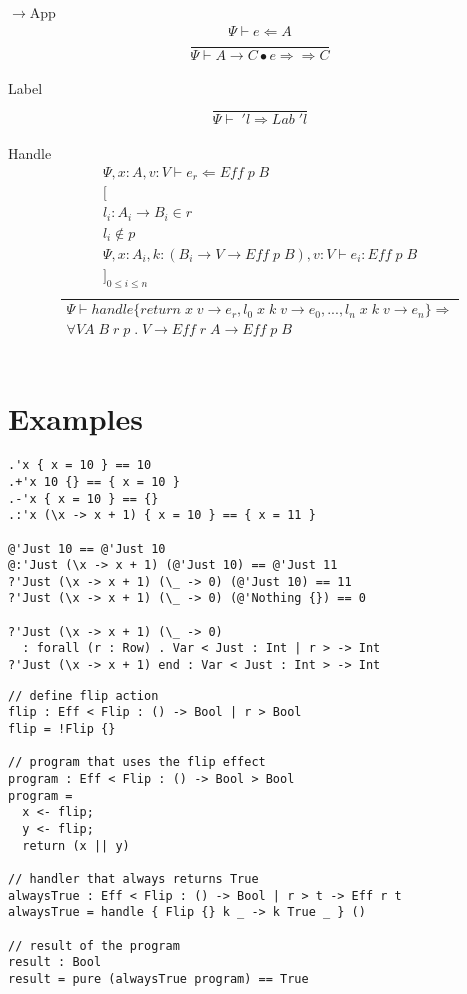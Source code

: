 \documentclass[12pt]{article}
\newcommand\synth[0]{\Rightarrow \!\!\! \Rightarrow}
\begin{document}
$\rightarrow$App \[\frac{
	\begin{array}{c}
	\Psi \vdash e \Leftarrow A \\
	\end{array}
}{
	\Psi \vdash A \rightarrow C \bullet e \synth C
}\]\\
Label \[\frac{
	\begin{array}{c}
	\end{array}
}{
	\Psi \vdash \; 'l \Rightarrow Lab \; 'l
}\]\\
Handle \[\frac{
	\begin{array}{c}
	\Psi , x : A, v : V \vdash e_r \Leftarrow {Eff} \; p \; B \\
	{[} \\
		l_i : A_i \rightarrow B_i  \in r \\
		l_i \notin p \\
		\Psi , x : A_i , k : (B_i \rightarrow V \rightarrow {Eff} \; p \; B) , v : V \vdash e_i : {Eff} \; p \; B \\
	{]}_{0 \leq i \leq n} \\
	\end{array}
}{
	\begin{array}{c}
	\Psi \vdash handle \{ return \; x \; v \rightarrow e_r, l_0 \; x \; k \; v \rightarrow e_0, ..., l_{n} \; x \; k \; v \rightarrow e_{n} \} \Rightarrow \\
		\forall V A \; B \; r \; p \; . \; V \rightarrow {Eff} \; r \; A \rightarrow {Eff} \; p \; B
	\end{array}
}\]\\

\newpage
\section{Examples}

\begin{lstlisting}[caption=Records and variants]
.'x { x = 10 } == 10
.+'x 10 {} == { x = 10 }
.-'x { x = 10 } == {}
.:'x (\x -> x + 1) { x = 10 } == { x = 11 }

@'Just 10 == @'Just 10
@:'Just (\x -> x + 1) (@'Just 10) == @'Just 11
?'Just (\x -> x + 1) (\_ -> 0) (@'Just 10) == 11
?'Just (\x -> x + 1) (\_ -> 0) (@'Nothing {}) == 0

?'Just (\x -> x + 1) (\_ -> 0)
  : forall (r : Row) . Var < Just : Int | r > -> Int
?'Just (\x -> x + 1) end : Var < Just : Int > -> Int
\end{lstlisting}

\begin{lstlisting}[caption=Basic effect handlers]
// define flip action
flip : Eff < Flip : () -> Bool | r > Bool
flip = !Flip {}

// program that uses the flip effect
program : Eff < Flip : () -> Bool > Bool
program =
  x <- flip;
  y <- flip;
  return (x || y)

// handler that always returns True
alwaysTrue : Eff < Flip : () -> Bool | r > t -> Eff r t
alwaysTrue = handle { Flip {} k _ -> k True _ } ()

// result of the program
result : Bool
result = pure (alwaysTrue program) == True
\end{lstlisting}
\end{document}
